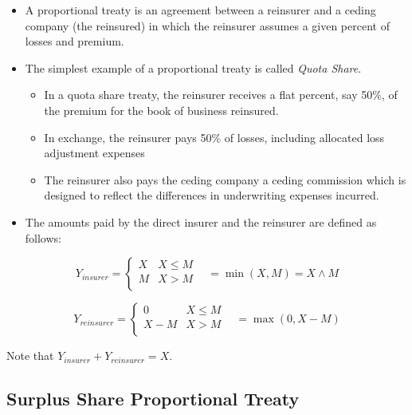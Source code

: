 \documentclass[]{book}
\theoremstyle{definition}
\theoremstyle{definition}
\theoremstyle{definition}
\theoremstyle{remark}
\begin{document}
\begin{itemize}
\item
  A proportional treaty is an agreement between a reinsurer and a ceding
  company (the reinsured) in which the reinsurer assumes a given percent
  of losses and premium.
\item
  The simplest example of a proportional treaty is called \emph{Quota
  Share}.

  \begin{itemize}
  \item
    In a quota share treaty, the reinsurer receives a flat percent, say
    50\%, of the premium for the book of business reinsured.
  \item
    In exchange, the reinsurer pays 50\% of losses, including allocated
    loss adjustment expenses
  \item
    The reinsurer also pays the ceding company a ceding commission which
    is designed to reflect the differences in underwriting expenses
    incurred.
  \end{itemize}
\item
  The amounts paid by the direct insurer and the reinsurer are defined
  as follows:
\end{itemize}

\begin{equation*}
Y_{insurer} =
\begin{cases}
X & X \le M\\
M & X >M \\
\end{cases} \ \ \ \ = \min(X,M) = X \wedge M
\end{equation*}

\begin{equation*}
Y_{reinsurer} =
\begin{cases}
0 & X \le M\\
X- M & X >M \\
\end{cases} \ \ \ \  = \max(0,X-M)
\end{equation*}

Note that \(Y_{insurer}+Y_{reinsurer}=X\).

\subsection{Surplus Share Proportional
Treaty}\label{surplus-share-proportional-treaty}
\end{document}
